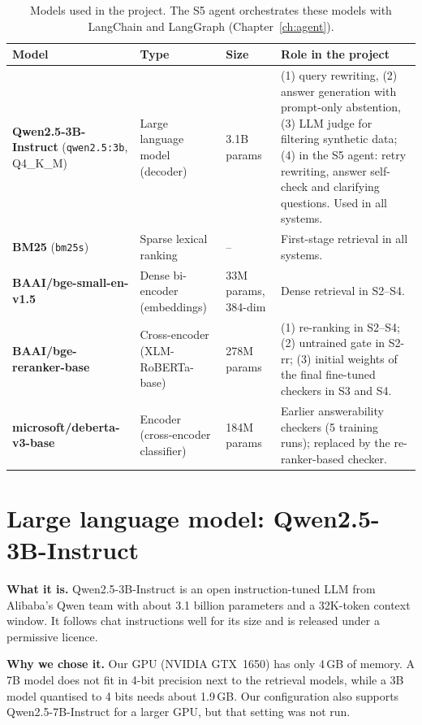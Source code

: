 \documentclass[11pt,a4paper]{report}
\newcommand{\sys}[1]{\textsf{#1}}
\begin{document}
\begin{table}[H]
\centering\small
\begin{tabularx}{\textwidth}{@{}p{3.6cm}p{2.4cm}p{1.4cm}Y@{}}
\toprule
Model & Type & Size & Role in the project \\
\midrule
\textbf{Qwen2.5-3B-Instruct} \cite{qwen} (\texttt{qwen2.5:3b}, Q4\_K\_M) & Large language model (decoder) & 3.1B params & (1) query rewriting, (2) answer generation with prompt-only abstention, (3) LLM judge for filtering synthetic data; (4) in the S5 agent: retry rewriting, answer self-check and clarifying questions. Used in all systems. \\
\textbf{BM25} (\texttt{bm25s}) \cite{bm25} & Sparse lexical ranking & -- & First-stage retrieval in all systems. \\
\textbf{BAAI/bge-small-en-v1.5} \cite{bge} & Dense bi-encoder (embeddings) & 33M params, 384-dim & Dense retrieval in \sys{S2}--\sys{S4}. \\
\textbf{BAAI/bge-reranker-base} \cite{bge} & Cross-encoder (XLM-RoBERTa-base) & 278M params & (1) re-ranking in \sys{S2}--\sys{S4}; (2) untrained gate in \sys{S2-rr}; (3) initial weights of the final fine-tuned checkers in \sys{S3} and \sys{S4}. \\
\textbf{microsoft/deberta-v3-base} \cite{deberta} & Encoder (cross-encoder classifier) & 184M params & Earlier answerability checkers (5 training runs); replaced by the re-ranker-based checker. \\
\bottomrule
\end{tabularx}
\caption{Models used in the project. The S5 agent orchestrates these models with LangChain and LangGraph (Chapter~\ref{ch:agent}).}
\label{tab:models}
\end{table}

\section{Large language model: Qwen2.5-3B-Instruct}
\textbf{What it is.} Qwen2.5-3B-Instruct \cite{qwen} is an open instruction-tuned LLM from Alibaba's Qwen team with about 3.1 billion parameters and a 32K-token context window. It follows chat instructions well for its size and is released under a permissive licence.

\textbf{Why we chose it.} Our GPU (NVIDIA GTX~1650) has only 4\,GB of memory. A 7B model does not fit in 4-bit precision next to the retrieval models, while a 3B model quantised to 4 bits needs about 1.9\,GB. Our configuration also supports Qwen2.5-7B-Instruct for a larger GPU, but that setting was not run.
\end{document}
